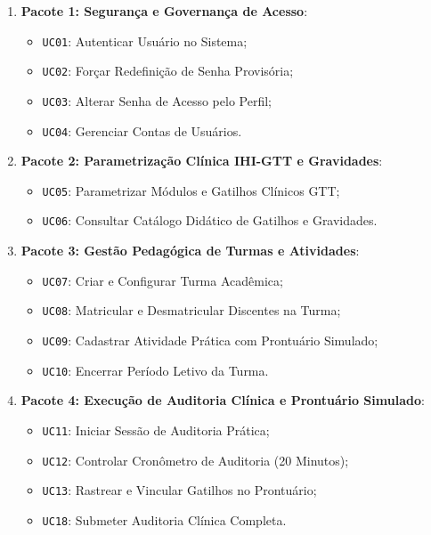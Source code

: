 \begin{enumerate}
    \item \textbf{Pacote 1: Segurança e Governança de Acesso}:
    \begin{itemize}
        \item \texttt{UC01}: Autenticar Usuário no Sistema;
        \item \texttt{UC02}: Forçar Redefinição de Senha Provisória;
        \item \texttt{UC03}: Alterar Senha de Acesso pelo Perfil;
        \item \texttt{UC04}: Gerenciar Contas de Usuários.
    \end{itemize}

    \item \textbf{Pacote 2: Parametrização Clínica IHI-GTT e Gravidades}:
    \begin{itemize}
        \item \texttt{UC05}: Parametrizar Módulos e Gatilhos Clínicos GTT;
        \item \texttt{UC06}: Consultar Catálogo Didático de Gatilhos e Gravidades.
    \end{itemize}

    \item \textbf{Pacote 3: Gestão Pedagógica de Turmas e Atividades}:
    \begin{itemize}
        \item \texttt{UC07}: Criar e Configurar Turma Acadêmica;
        \item \texttt{UC08}: Matricular e Desmatricular Discentes na Turma;
        \item \texttt{UC09}: Cadastrar Atividade Prática com Prontuário Simulado;
        \item \texttt{UC10}: Encerrar Período Letivo da Turma.
    \end{itemize}

    \item \textbf{Pacote 4: Execução de Auditoria Clínica e Prontuário Simulado}:
    \begin{itemize}
        \item \texttt{UC11}: Iniciar Sessão de Auditoria Prática;
        \item \texttt{UC12}: Controlar Cronômetro de Auditoria (20 Minutos);
        \item \texttt{UC13}: Rastrear e Vincular Gatilhos no Prontuário;
        \item \texttt{UC18}: Submeter Auditoria Clínica Completa.
    \end{itemize}


\end{enumerate}
